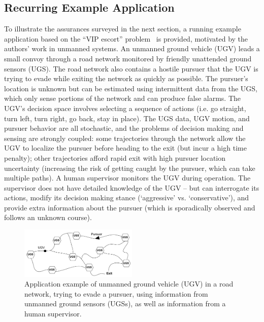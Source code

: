 \subsection{Recurring Example Application} \label{sec:mot_example}
    To illustrate the assurances surveyed in the next section, a running example application based on the ``VIP escort'' problem~\cite{Humphrey2012-lr} is provided, motivated by the authors' work in unmanned systems. 
    An unmanned ground vehicle (UGV) leads a small convoy through a road network monitored by friendly unattended ground sensors (UGS). The road network also contains a hostile pursuer that the UGV is trying to evade while exiting the network as quickly as possible. 
    The pursuer's location is unknown but can be estimated using intermittent data from the UGS, which only sense portions of the network and can produce false alarms. The UGV's decision space involves selecting a sequence of actions (i.e. go straight, turn left, turn right, go back, stay in place). The UGS data, UGV motion, and pursuer behavior are all stochastic, and the problems of decision making and sensing are strongly coupled: some trajectories through the network allow the UGV to localize the pursuer before heading to the exit (but incur a high time penalty); other trajectories afford rapid exit with high pursuer location uncertainty (increasing the risk of getting caught by the pursuer, which can take multiple paths). 
    A human supervisor monitors the UGV during operation. 
    The supervisor does not have detailed knowledge of the UGV -- but can interrogate its actions, modify its decision making stance (`aggressive' vs. `conservative'), and provide extra information about the pursuer (which is sporadically observed and follows an unknown course). 
    
	\begin{figure}[t]%
    	\centering
     	\includegraphics[width=0.5\textwidth]{Figures/RoadNet}
    	\caption{Application example of unmanned ground vehicle (UGV) in a road network, trying to evade a pursuer, using information from unmanned ground sensors (UGSs), as well as information from a human supervisor.} 
        \label{fig:RoadNet}
    \end{figure}

